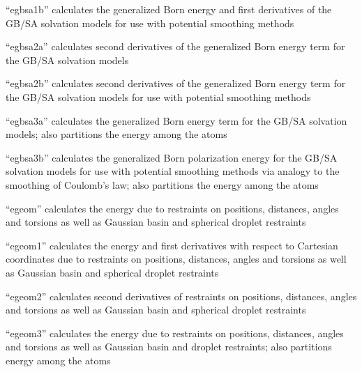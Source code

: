 \documentclass[letterpaper,11pt,english]{sphinxmanual}
\begin{document}

“egbsa1b” calculates the generalized Born energy and first derivatives of the GB/SA solvation models for use with potential smoothing methods


“egbsa2a” calculates second derivatives of the generalized Born energy term for the GB/SA solvation models


“egbsa2b” calculates second derivatives of the generalized Born energy term for the GB/SA solvation models for use with potential smoothing methods


“egbsa3a” calculates the generalized Born energy term for the GB/SA solvation models; also partitions the energy among the atoms


“egbsa3b” calculates the generalized Born polarization energy for the GB/SA solvation models for use with potential smoothing methods via analogy to the smoothing of Coulomb’s law; also partitions the energy among the atoms


“egeom” calculates the energy due to restraints on positions, distances, angles and torsions as well as Gaussian basin and spherical droplet restraints


“egeom1” calculates the energy and first derivatives with respect to Cartesian coordinates due to restraints on positions, distances, angles and torsions as well as Gaussian basin and spherical droplet restraints


“egeom2” calculates second derivatives of restraints on positions, distances, angles and torsions as well as Gaussian basin and spherical droplet restraints


“egeom3” calculates the energy due to restraints on positions, distances, angles and torsions as well as Gaussian basin and droplet restraints; also partitions energy among the atoms

\end{document}
